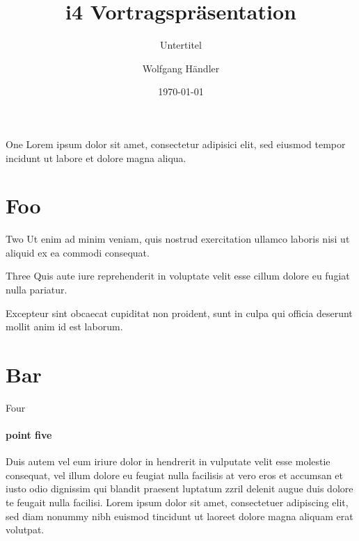 \documentclass[aspectratio=1610,12pt]{beamer}
\title[i4talk]{i4 Vortragspräsentation}
\subtitle{Untertitel}
\date{\today}
\author{Wolfgang Händler}
\institute{Friedrich-Alexander-Universität Erlangen-Nürnberg}
\begin{document}
\maketitle[extern]

\begin{frame}{One}
	Lorem ipsum dolor sit amet, consectetur adipisici elit, sed eiusmod tempor incidunt ut labore et dolore magna aliqua. 
\end{frame}


\section{Foo}

\begin{frame}{Two}
	Ut enim ad minim veniam, quis nostrud exercitation ullamco laboris nisi ut aliquid ex ea commodi consequat.
\end{frame}

\begin{frame}{Three}
	Quis aute iure reprehenderit in voluptate velit esse cillum dolore eu fugiat nulla pariatur.
	\begin{block}{Excepteur}
		sint obcaecat cupiditat non proident, sunt in culpa qui officia deserunt mollit anim id est laborum.
	\end{block}
\end{frame}


\section{Bar}

\begin{frame}{Four}
	\framesubtitle{point five}
	\small
	Duis autem vel eum iriure dolor in hendrerit in vulputate velit esse molestie consequat, vel illum dolore eu feugiat nulla facilisis at vero eros et accumsan et iusto odio dignissim qui blandit praesent luptatum zzril delenit augue duis dolore te feugait nulla facilisi. Lorem ipsum dolor sit amet, consectetuer adipiscing elit, sed diam nonummy nibh euismod tincidunt ut laoreet dolore magna aliquam erat volutpat.


\end{frame}
\end{document}
